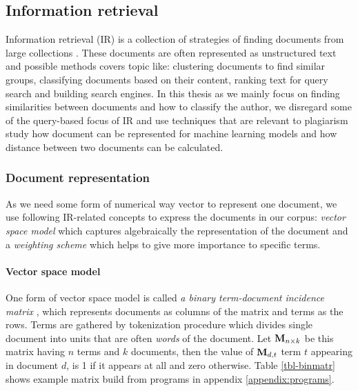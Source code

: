 \subsection{Information retrieval}

Information retrieval (IR) is a collection of strategies of finding documents from large collections \cite{Manning:2008:IIR:1394399}. These documents are often represented as unstructured text and possible methods covers topic like: clustering documents to find similar groups, classifying documents based on their content, ranking text for query search and building search engines. In this thesis as we mainly focus on finding similarities between documents and how to classify the author, we disregard some of the query-based focus of IR and use techniques that are relevant to plagiarism study \ie how document can be represented for machine learning models and how distance between two documents can be calculated.




\subsubsection{Document representation}

As we need some form of numerical way \ie vector to represent one document, we use following IR-related concepts to express the documents in our corpus: \emph{vector space model} which captures algebraically the representation of the document and a \emph{weighting scheme} which helps to give more importance to specific terms.


\paragraph{Vector space model}

One form of vector space model is called \emph{a binary term-document incidence matrix} \cite{Manning:2008:IIR:1394399}, which represents documents as columns of the matrix and terms as the rows. Terms are gathered by tokenization procedure which divides single document into units that are often \emph{words} of the document. Let $\mathbf{M}_{n \times k}$ be this matrix having $n$ terms and $k$ documents, then the value of $\mathbf{M}_{d, t}$ \ie term $t$ appearing in document $d$, is 1 if it appears at all and zero otherwise. Table \ref{tbl-binmatr} shows example matrix build from programs in appendix \ref{appendix:programs}.  

